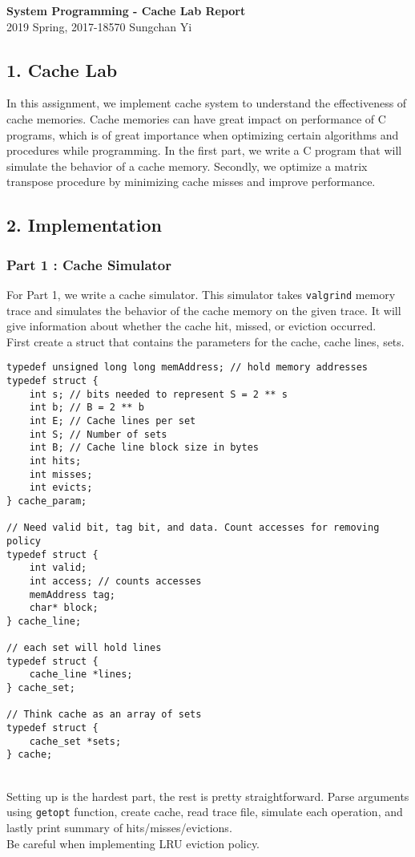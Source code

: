 \documentclass[12pt]{report}
\begin{document}
\begin{center}
\textbf{\Large System Programming - Cache Lab Report}\\
\large 2019 Spring, 2017-18570 Sungchan Yi
\end{center}
\subsection*{1. Cache Lab}
In this assignment, we implement cache system to understand the effectiveness of cache memories. Cache memories can have great impact on performance of C programs, which is of great importance when optimizing certain algorithms and procedures while programming. In the first part, we write a C program that will simulate the behavior of a cache memory. Secondly, we optimize a matrix transpose procedure by minimizing cache misses and improve performance.

\subsection*{2. Implementation}
\subsubsection*{Part 1 : Cache Simulator}
For Part 1, we write a cache simulator. This simulator takes \texttt{valgrind} memory trace and simulates the behavior of the cache memory on the given trace. It will give information about whether the cache hit, missed, or eviction occurred.\\
First create a struct that contains the parameters for the cache, cache lines, sets.
\begin{lstlisting}[style=Cstyle]
typedef unsigned long long memAddress; // hold memory addresses
typedef struct {
	int s; // bits needed to represent S = 2 ** s
	int b; // B = 2 ** b
	int E; // Cache lines per set
	int S; // Number of sets
	int B; // Cache line block size in bytes
	int hits;
	int misses;
	int evicts;
} cache_param;

// Need valid bit, tag bit, and data. Count accesses for removing policy
typedef struct {
	int valid;
	int access; // counts accesses
	memAddress tag;
	char* block;
} cache_line;

// each set will hold lines
typedef struct {
	cache_line *lines;
} cache_set;

// Think cache as an array of sets
typedef struct {
	cache_set *sets;
} cache;
\end{lstlisting}~\\
Setting up is the hardest part, the rest is pretty straightforward. Parse arguments using \texttt{getopt} function, create cache, read trace file, simulate each operation, and lastly print summary of hits/misses/evictions.\\
Be careful when implementing LRU eviction policy.
\end{document}
